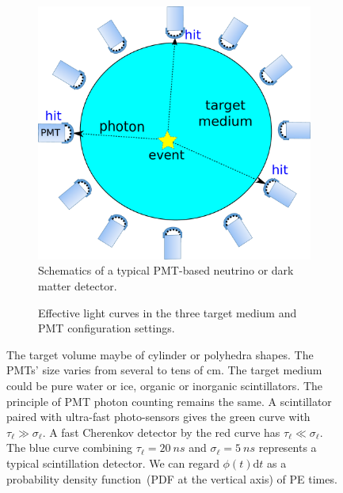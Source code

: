 \begin{figure}[!ht]
  \begin{subfigure}{0.44\textwidth}
  \includegraphics[width=\linewidth]{figures/detector.pdf}
  \caption{\label{fig:detector} Schematics of a typical PMT-based neutrino or dark matter detector.}
\end{subfigure}
\hfill
\begin{subfigure}{0.54\textwidth}
  \resizebox{\linewidth}{!}{}
  \caption{\label{fig:time-pro} Effective light curves in the three target medium and PMT configuration settings.}
\end{subfigure}
  \caption{ The target volume maybe of cylinder or polyhedra shapes.  The PMTs' size varies from several to tens of \si{cm}.  The target medium could be pure water or ice, organic or inorganic scintillators. The principle of PMT photon counting remains the same.  A scintillator paired with ultra-fast photo-sensors gives the green curve with $\tau_\ell \gg \sigma_\ell$.  A fast Cherenkov detector by the red curve has $\tau_\ell \ll \sigma_\ell$.  The blue curve combining $\tau_\ell=\SI{20}{ns}$ and $\sigma_\ell=\SI{5}{ns}$ represents a typical scintillation detector.  We can regard $\phi(t)\mathrm{d}t$ as a probability density function~(PDF at the vertical axis) of PE times.}
\end{figure}

